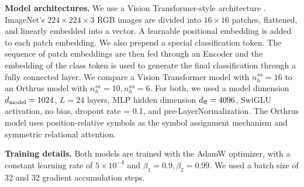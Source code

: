 \textbf{Model architectures.} We use a Vision Transformer-style architecture \citep{dosovitskiyImageWorth16x162020}. ImageNet's $224 \times 224 \times 3$ RGB images are divided into $16 \times 16$ patches, flattened, and linearly embedded into a vector. A learnable positional embedding is added to each patch embedding. We also prepend a special classification token. The sequence of patch embeddings are then fed through an Encoder and the embedding of the class token is used to generate the final classification through a fully connected layer. We compare a Vision Transformer model with $n_h^{sa} = 16$ to an Orthrus model with $n_h^{sa} = 10, n_h^{sa} = 6$. For both, we used a model dimension $d_{\mathrm{model}} = 1024$, $L = 24$ layers, MLP hidden dimension $d_{\mathrm{ff}} = 4096$, SwiGLU activation, no bias, dropout rate = 0.1, and pre-LayerNormalization. The Orthrus model uses position-relative symbols as the symbol assignment mechanism and symmetric relational attention.

\textbf{Training details.} Both models are trained with the AdamW optimizer, with a constant learning rate of $5 \times 10^{-4}$ and $\beta_1 = 0.9, \beta_2 = 0.99$. We used a batch size of 32 and 32 gradient accumulation steps.